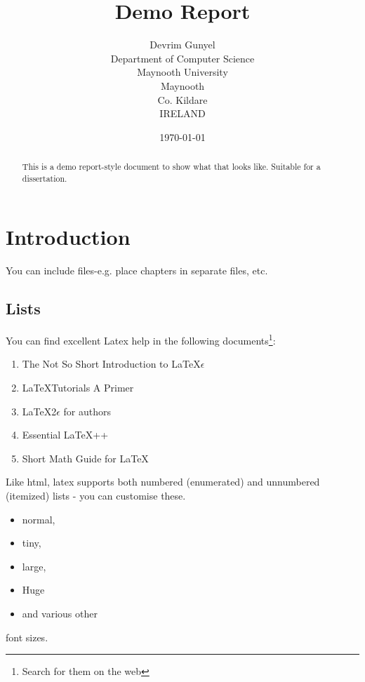 \documentclass[a4paper,12pt]{report}
\begin{document}
\author{Devrim Gunyel\\
  Department of Computer Science\\
  Maynooth University\\
  Maynooth\\
  Co. Kildare\\
  IRELAND}
\date{\today}
\title{Demo Report}
\maketitle

\begin{abstract}
This is a demo report-style document to show what that looks like. Suitable for a dissertation.
\end{abstract}

\tableofcontents

\newpage

\chapter{Introduction}
\label{intro}

You can include files-e.g. place chapters in separate files, etc.

\section{Lists}

You can find excellent Latex help in the following documents\footnote{Search for them on the web}:
\begin{enumerate}
\item The Not So Short Introduction to \LaTeX $\epsilon$ 
\item \LaTeX Tutorials A Primer
\item \LaTeX2$\epsilon$ for authors
\item Essential \LaTeX++
\item Short Math Guide for \LaTeX
\end{enumerate}

Like html, latex supports both numbered (enumerated) and unnumbered (itemized) lists - you can customise these.
\begin{itemize}
\item normal,
\item {\tiny tiny},
\item {\large large},
\item {\Huge Huge}
\item and {\large various other}
\end{itemize}
font sizes.
\end{document}
